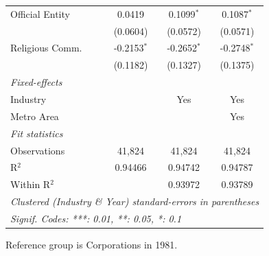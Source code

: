 \documentclass[
  12pt]{article}
\theoremstyle{definition}
\theoremstyle{remark}
\begin{document}
\begin{table}
\begin{minipage}{\linewidth}
\begin{tabular}{lccc}
   Official Entity   & 0.0419         & 0.1099$^{*}$   & 0.1087$^{*}$\\   
                     & (0.0604)       & (0.0572)       & (0.0571)\\   
   Religious Comm.   & -0.2153$^{*}$  & -0.2652$^{*}$  & -0.2748$^{*}$\\   
                     & (0.1182)       & (0.1327)       & (0.1375)\\   
   \midrule
   \emph{Fixed-effects}\\
   Industry          &                & Yes            & Yes\\  
   Metro Area        &                &                & Yes\\  
   \midrule
   \emph{Fit statistics}\\
   Observations      & 41,824         & 41,824         & 41,824\\  
   R$^2$             & 0.94466        & 0.94742        & 0.94787\\  
   Within R$^2$      &                & 0.93972        & 0.93789\\  
   \midrule \midrule
   \multicolumn{4}{l}{\emph{Clustered (Industry \& Year) standard-errors in parentheses}}\\
   \multicolumn{4}{l}{\emph{Signif. Codes: ***: 0.01, **: 0.05, *: 0.1}}\\
\end{tabular}

\end{minipage}%
\newline
\begin{minipage}{\linewidth}

\par \raggedright

\end{minipage}%
\newline
\begin{minipage}{\linewidth}

Reference group is Corporations in 1981.

\end{minipage}%
\newline
\begin{minipage}{\linewidth}

\par\endgroup

\end{minipage}%

\end{table}%
\end{document}
